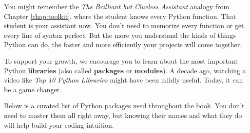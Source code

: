 You might remember the \textit{The Brilliant but Clueless Assistant} analogy from Chapter \ref{chap:toolkit}, where the student knows every Python function. That student is your assistant now. You don’t need to memorize every function or get every line of syntax perfect. But the more you understand the kinds of things Python can do, the faster and more efficiently your projects will come together. 

To support your growth, we encourage you to learn about the most important Python \textbf{libraries} (also called \textbf{packages} or \textbf{modules}). A decade ago, watching a video like \textit{Top 10 Python Libraries} might have been mildly useful. Today, it can be a game changer. 

Below is a curated list of Python packages used throughout the book. You don’t need to master them all right away, but knowing their names and what they do will help build your coding intuition.

